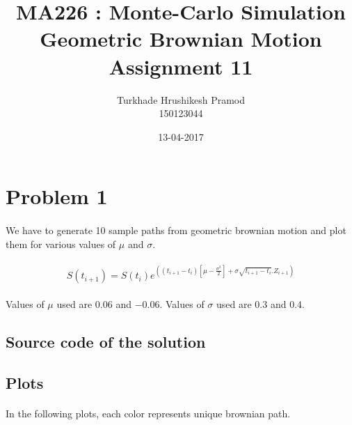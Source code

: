 \documentclass{article}
\title{%
	MA226 : Monte-Carlo Simulation\\
	 Geometric Brownian Motion\\
	 \large Assignment 11}
\date{13-04-2017}
\author{%
	Turkhade Hrushikesh Pramod\\
	150123044	}
\begin{document}
	\maketitle
	
	\newpage
	
	\section{Problem 1}
	\paragraph{}
		We have to generate 10 sample paths from geometric brownian motion and plot them for various values of $\mu$ and $\sigma$.
		
	\paragraph{}
	\[S(t_{i+1}) = S(t_i)e^{((t_{i+1}-t_{i})[\mu- \frac{{\sigma^{2}}}{2}] + \sigma \sqrt{t_{i+1}-t_i}.Z_{i+1})}\]
	
	\paragraph{}
	Values of $\mu$ used are $0.06$ and $-0.06$.
	Values of $\sigma$ used are $0.3$ and $0.4$.
		
	\subsection{Source code of the solution}
		

	\clearpage

		\subsection{Plots}
	
		\paragraph{}
		In the following plots, each color represents unique brownian path.
		
\end{document}
